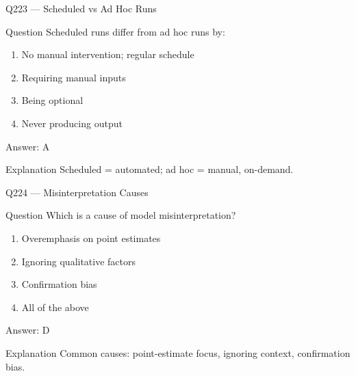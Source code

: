 \documentclass[aspectratio=169,8pt]{beamer}
\begin{document}
								\begin{frame}{Q223 --- Scheduled vs Ad Hoc Runs}
									\begin{block}{Question}
										Scheduled runs differ from ad hoc runs by:
										\begin{enumerate}
											\item No manual intervention; regular schedule
											\item Requiring manual inputs
											\item Being optional
											\item Never producing output
										\end{enumerate}
									\end{block}
									\begin{exampleblock}{Answer: A}\end{exampleblock}
									\begin{block}{Explanation}
										Scheduled = automated; ad hoc = manual, on-demand.
									\end{block}
								\end{frame}
								
								\begin{frame}{Q224 --- Misinterpretation Causes}
									\begin{block}{Question}
										Which is a cause of model misinterpretation?
										\begin{enumerate}
											\item Overemphasis on point estimates
											\item Ignoring qualitative factors
											\item Confirmation bias
											\item All of the above
										\end{enumerate}
									\end{block}
									\begin{exampleblock}{Answer: D}\end{exampleblock}
									\begin{block}{Explanation}
										Common causes: point-estimate focus, ignoring context, confirmation bias.
									\end{block}
								\end{frame}
								
\end{document}
